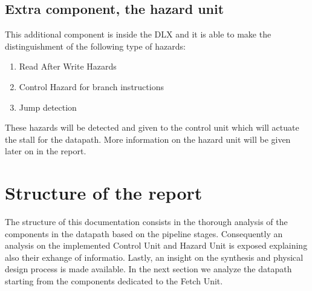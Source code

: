 		\subsection{ Extra component, the hazard unit }

		This additional component is inside the DLX and it is able to make the distinguishment of the following type of hazards:

		\begin{enumerate}
			\item Read After Write Hazards 
			\item Control Hazard for branch instructions
			\item Jump detection
			\end{enumerate}

		These hazards will be detected and given to the control unit which will actuate the stall for the datapath. More information on the hazard unit will be given later on in the report.

		\section { Structure of the report }

		The structure of this documentation consists in the thorough analysis of the components in the datapath based on the pipeline stages. 
		Consequently an analysis on the implemented Control Unit and Hazard Unit is exposed explaining also their exhange of informatio.
		Lastly, an insight on the synthesis and physical design process is made available. In the next section we analyze the datapath starting from the components
		dedicated to the Fetch Unit.


